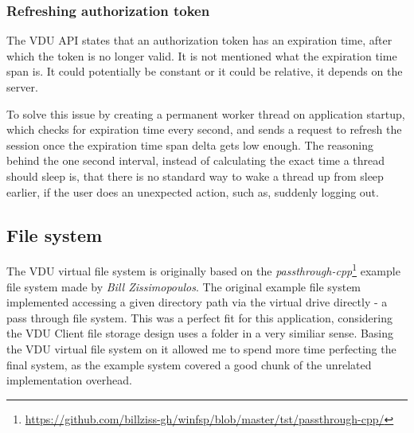 \subsubsection{Refreshing authorization token}
The VDU API states that an authorization token has an expiration time, after which the token is no longer valid. It is not mentioned what the expiration time span is. It could potentially be constant or it could be relative, it depends on the server.

To solve this issue by creating a permanent worker thread on application startup, which checks for expiration time every second, and sends a request to refresh the session once the expiration time span delta gets low enough. The reasoning behind the one second interval, instead of calculating the exact time a thread should sleep is, that there is no standard way to wake a thread up from sleep earlier, if the user does an unexpected action, such as, suddenly logging out. 

\subsection{File system}
The VDU virtual file system is originally based on the \textit{passthrough-cpp}\footnote{\url{https://github.com/billziss-gh/winfsp/blob/master/tst/passthrough-cpp/}} example file system made by \textit{Bill Zissimopoulos}. The original example file system implemented accessing a given directory path via the virtual drive directly - a pass through file system. This was a perfect fit for this application, considering the VDU Client file storage design uses a folder in a very similiar sense. Basing the VDU virtual file system on it allowed me to spend more time perfecting the final system, as the example system covered a good chunk of the unrelated implementation overhead.


